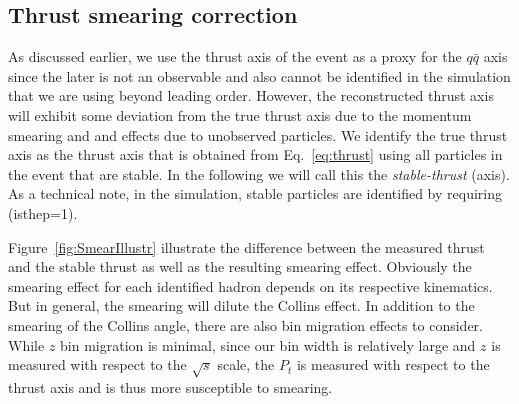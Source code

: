 


\subsection{\texorpdfstring{Thrust smearing correction}{Thrust smearing correction}}
\label{sec:smearingcorrection}

As discussed earlier, we use the thrust axis of the event as a proxy for the $q\bar{q}$ axis since the later is not an observable and  also cannot be identified in the simulation that we are using beyond leading order.
However, the reconstructed thrust axis will exhibit some deviation from the true thrust axis due to the momentum smearing and and effects due to unobserved particles. We identify the true thrust axis as the thrust axis that is obtained from Eq.~\ref{eq:thrust} using all particles in the event that are stable. In the following we will call this the  {\em stable-thrust} (axis). As a technical note, in the simulation, stable particles are identified by requiring  (isthep=1).

 Figure~\ref{fig:SmearIllustr} illustrate the difference between the measured thrust and the stable thrust as well as the resulting smearing effect. Obviously the smearing effect for each identified hadron depends on its respective kinematics. But in general, the smearing will dilute the Collins effect. In addition to the smearing of the Collins angle, there are also bin migration effects to consider. While $z$ bin migration is minimal, since our bin width is relatively large and $z$ is measured with respect to the $\sqrt{s}$ scale, the $P_t$ is measured with respect to the thrust axis and is thus more susceptible to smearing.

